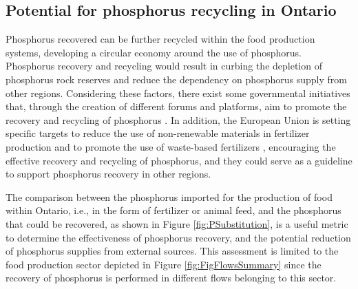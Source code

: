\documentclass[authoryear]{elsarticle}
\begin{document}
\subsection{Potential for phosphorus recycling in Ontario}
Phosphorus recovered can be further recycled within the food production systems, developing a circular economy around the use of phosphorus. Phosphorus recovery and recycling would result in curbing the depletion of phosphorus rock reserves and reduce the dependency on phosphorus supply from other regions.
Considering these factors, there exist some governmental initiatives that, through the creation of different forums and platforms, aim to promote the recovery and recycling of phosphorus \citep{NRRPlatform, PFlows_Ontario}. In addition, the European Union is setting specific targets to reduce the use of non-renewable materials in fertilizer production \citep{EurpeanComissionNewFertilizersGoal} and to promote the use of waste-based fertilizers \citep{EurpeanComissionFertilizersRegulation}, encouraging the effective recovery and recycling of phosphorus, and they could serve as a guideline to support phosphorus recovery in other regions. 

The comparison between the phosphorus imported for the production of food within Ontario, i.e., in the form of fertilizer or animal feed, and the phosphorus that could be recovered, as shown in Figure \ref{fig:PSubstitution}, is a useful metric to determine the effectiveness of phosphorus recovery, and the potential reduction of phosphorus supplies from external sources. This assessment is limited to the food production sector depicted in Figure \ref{fig:FigFlowsSummary} since the recovery of phosphorus is performed in different flows belonging to this sector.
\end{document}
